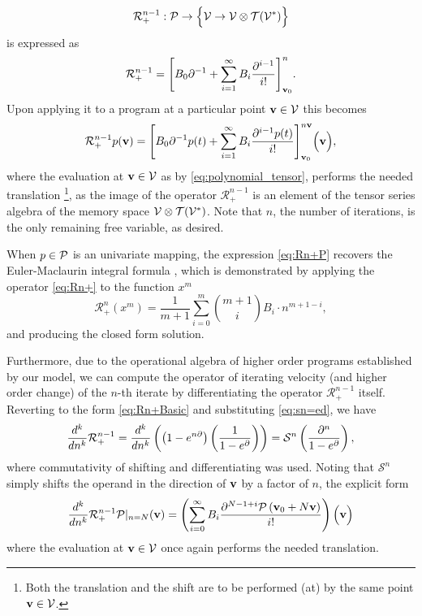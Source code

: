 $$\mathcal{R}^{n-1}_+:\mathcal{P}\to\Big\{\mathcal{V}\to \mathcal{V}\otimes \mathcal{T}(\mathcal{V}^*)\Big\}$$
is expressed as 
    \begin{equation}\label{eq:Rn+}
      \mathcal{R}^{n-1}_+=\Bigg[B_0\partial^{-1}+\sum\limits_{i=1}^{\infty}B_i\frac{\partial^{i-1}}{i!}\Bigg]_{\mathbf{v}_0}^{n}.
    \end{equation}
Upon applying it to a program at a particular point $\mathbf{v}\in \mathcal{V}$ this becomes
\begin{equation}\label{eq:Rn+P}
  \mathcal{R}^{n-1}_+p(\mathbf{v})=\Bigg[B_0\partial^{-1}p(t)+\sum\limits_{i=1}^{\infty}B_i\frac{\partial^{i-1}p(t)}{i!}\Bigg]_{\mathbf{v}_0}^{n\mathbf{v}} \Big(\mathbf{v}\Big),
    \end{equation}
where the evaluation at $\mathbf{v}\in \mathcal{V}$ as by \eqref{eq:polynomial_tensor}, performs the needed translation
\footnote{Both the translation and the shift are to be performed (at) by the same point $\mathbf{v}\in\mathcal{V}$.},
as the image of the operator $\mathcal{R}^{n-1}_+$ is an element of the tensor series algebra of the memory space $\mathcal{V}\otimes \mathcal{T}(\mathcal{V}^*)$.
Note that $n$, the number of iterations, is the only remaining free variable, as desired.
\begin{remark}
  When $p\in\mathcal{P}$ is an univariate mapping, the expression \eqref{eq:Rn+P} recovers the Euler-Maclaurin integral formula \cite{apostol1999elementary}, which is demonstrated by applying the operator \eqref{eq:Rn+} to the function $x^m$
$$\mathcal{R}^n_+(x^m)=\frac{1}{m+1}\sum_{i=0}^m{m+1\choose i}B_i\cdot n^{m+1-i},$$
and producing the closed form solution.
\end{remark}
Furthermore, due to the operational algebra of higher order programs established by our model, we can compute the operator of iterating velocity (and higher order change) of the $n$-th iterate by differentiating the operator $\mathcal{R}^{n-1}_+$ itself. Reverting to the form \eqref{eq:Rn+Basic} and substituting \eqref{eq:sn=ed}, we have
\begin{equation}
  \frac{d^k}{dn^k}\mathcal{R}^{n-1}_+=\frac{d^k}{dn^k}\left(\left(1-e^{n\partial}\right)\left(\frac{1}{1-e^\partial}\right)\right)=\mathcal{S}^n\left(\frac{\partial^n}{1-e^\partial}\right),
   \end{equation}
where commutativity of shifting and differentiating was used. Noting that $\mathcal{S}^n$ simply shifts the operand in the direction of $\mathbf{v}$ by a factor of $n$, the explicit form 
\begin{equation}
        \frac{d^k}{dn^k}\mathcal{R}^{n-1}_+\mathcal{P}\vert_{n=N}(\mathbf{v})=\left(\sum\limits_{i=0}^{\infty}B_i\frac{\partial^{N-1+i}\mathcal{P}\left(\mathbf{v}_0+N\mathbf{v}\right)}{i!}\right)\Big(\mathbf{v}\Big)
        \end{equation}
where the evaluation at $\mathbf{v}\in \mathcal{V}$ once again performs the needed translation.


